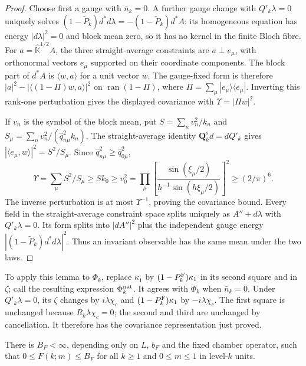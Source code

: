 \documentclass[11pt,letterpaper,reqno]{amsart}
\makeatletter
\theoremstyle{definition}
\newcommand{\ms@minorstart}{%
  \pushQED{\qed}\renewcommand{\qedsymbol}{$\blacksquare$}}
\newenvironment{proposition}[1][]{\ms@minorstart\ms@proposition[#1]}
  {\popQED\endms@proposition}
\theoremstyle{remark}
\makeatother
\begin{document}
\begin{proof}
Choose first a gauge with $\bar n_k=0$.  A further gauge
change with $Q'_k\lambda=0$ uniquely solves
$(1-\widetilde P_k)d^*d\lambda=
 -(1-\widetilde P_k)d^*A$:
its homogeneous equation has energy $|d\lambda|^2=0$ and
block mean zero, so it has no kernel in the finite Bloch fibre.
For $a=\widehat{\mathbb K}^{1/2}A$, the three straight-average
constraints are $a\perp e_\mu$, with orthonormal vectors
$e_\mu$ supported on their coordinate components.  The block
part of $d^*A$ is $\langle w,a\rangle$ for a unit vector $w$.
The gauge-fixed form is therefore
$|a|^2-|\langle(1-\Pi)w,a\rangle|^2$ on
$\operatorname{ran}(1-\Pi)$, where
$\Pi=\sum_\mu|e_\mu\rangle\langle e_\mu|$.
Inverting this rank-one perturbation gives the displayed
covariance with $\Upsilon=|\Pi w|^2$.

If $v_n$ is the symbol of the block mean, put
$S=\sum_nv_n^2/k_n$ and
$S_\mu=\sum_nv_n^2/(\hat q_{n\mu}^2k_n)$.
The straight-average identity $\mathbf Q_k^sd=dQ'_k$
gives $|\langle e_\mu,w\rangle|^2=S^2/S_\mu$.
Since $\hat q_{n\mu}^2\ge\hat q_{0\mu}^2$,
\[
 \Upsilon=\sum_\mu S^2/S_\mu\ge Sk_0\ge v_0^2
 =\prod_\mu\left[\frac{\sin(\xi_\mu/2)}
                       {h^{-1}\sin(h\xi_\mu/2)}\right]^2
 \ge(2/\pi)^6.
\]
The inverse perturbation is at most $\Upsilon^{-1}$, proving
the covariance bound.  Every field in the straight-average
constraint space splits uniquely as $A''+d\lambda$ with
$Q'_k\lambda=0$.  Its form splits into $|dA''|^2$ plus the
independent gauge energy
$|(1-\widetilde P_k)d^*d\lambda|^2$.  Thus an invariant
observable has the same mean under the two laws.
\end{proof}

To apply this lemma to $\Phi_k$, replace $\kappa_1$ by
$(1-P_k^{\rm F})\kappa_1$ in its second square and in $\zeta$; call
the resulting expression $\Phi_k^{\rm nat}$.  It agrees with
$\Phi_k$ when $\bar n_k=0$.  Under $Q'_k\lambda=0$, its
$\zeta$ changes by $i\lambda\chi_c$ and
$(1-P_k^{\rm F})\kappa_1$ by $-i\lambda\chi_c$.
The first square is unchanged because $R_k\lambda\chi_c=0$;
the second and third are unchanged by cancellation.
It therefore has the covariance representation just proved.

\begin{proposition}[Bounded cumulative loop]\label{C-398-4-bound}
There is $B_F<\infty$, depending only on $L$, $b_F$ and the
fixed chamber operator, such that $0\le F(k;m)\le B_F$ for
all $k\ge1$ and $0\le m\le1$ in level-$k$ units.
\end{proposition}
\end{document}
